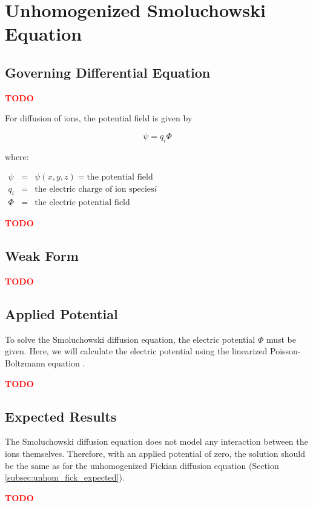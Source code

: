 
\section{Unhomogenized Smoluchowski Equation}\label{sec:unhom_smol}

\subsection{Governing Differential Equation}\label{subsec:unhom_smol_gov}

\textcolor{red}{\textbf{TODO}}

For diffusion of ions, the potential field is given by

\begin{equation}
\psi=q_i \Phi
\end{equation}

where:

$\begin{array}{rcl}
\psi & = & \psi(x,y,z) = \text{the potential field} \\
q_i & = & \text{the electric charge of ion species} i\\
\Phi & = & \text{the electric potential field}
\end{array}$

\textcolor{red}{\textbf{TODO}}

\subsection{Weak Form}\label{subsec:unhom_smol_weak}

\textcolor{red}{\textbf{TODO}}

\subsection{Applied Potential}\label{subsec:unhom_smol_potential}

To solve the Smoluchowski diffusion equation, the electric potential $\Phi$ must be given.
Here, we will calculate the electric potential using the linearized Poisson-Boltzmann equation
\cite{McQuarrie-StatMech}.

\textcolor{red}{\textbf{TODO}}

\subsection{Expected Results}\label{subsec:unhom_smol_expected}

The Smoluchowski diffusion equation does not model any interaction between the ions themselves.
Therefore, with an applied potential of zero,
the solution should be the same as for the
unhomogenized Fickian diffusion equation (Section \ref{subsec:unhom_fick_expected}).

\textcolor{red}{\textbf{TODO}}

